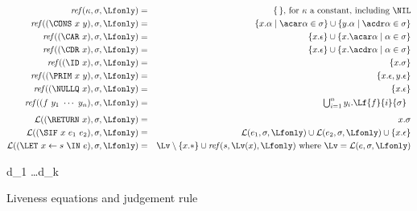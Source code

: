 \begin{figure}[t]  
\begin{eqnarray*}
\mathit{ref\/}(\kappa,\sigma,\Lfonly)
          &=& \{\,\} \mbox{, for $\kappa$ a constant, including $\NIL$}\\
\mathit{ref\/}((\CONS~x~y),\sigma,\Lfonly)
          &=& \{x.\alpha \mid \acar\alpha \in \sigma\} \cup \{y.\alpha \mid \acdr\alpha \in \sigma\} \\
\mathit{ref\/}((\CAR~x),\sigma,\Lfonly)
          &=& \{x.\epsilon\} \cup \{x.\acar\alpha \mid \alpha \in \sigma\} \\
\mathit{ref\/}((\CDR~x),\sigma,\Lfonly)
          &=& \{x.\epsilon\} \cup \{x.\acdr\alpha \mid \alpha \in \sigma\} \\
\mathit{ref\/}((\ID~x),\sigma,\Lfonly)
          &=& \{x.\sigma\} \\
\mathit{ref\/}((\PRIM~x~y),\sigma,\Lfonly)
          &=& \{x.\epsilon,y.\epsilon\} \\
\mathit{ref\/}((\NULLQ~x),\sigma,\Lfonly)
          &=& \{x.\epsilon\} \\
\mathit{ref\/}((f~y_1~\cdots~y_n),\sigma,\Lfonly)
          &=&  \begin{array}{@{}l}  %
               \bigcup_{i=1}^n y_i.\Lf{f}{i}{\sigma}
               \end{array}
\\[1ex]
\mathcal{L}((\RETURN~x),\sigma,\Lfonly) &=& x.\sigma \\
\mathcal{L}((\SIF~x~e_1~e_2),\sigma,\Lfonly) &=&
        \mathcal{L}(e_1,\sigma,\Lfonly) \cup
        \mathcal{L}(e_2,\sigma,\Lfonly) \cup
        \{x.\epsilon\} \\
\mathcal{L}((\LET~x \leftarrow  s~\IN~e),\sigma,\Lfonly) &=&
        \Lv
           \setminus \{x.*\}
           \cup \mathit{ref\/}(s,\Lv(x),\Lfonly)
\mbox{ where } \Lv = \mathcal{L}(e,\sigma,\Lfonly)
\end{eqnarray*}

\begin{minipage}{0.85\textwidth}
        { d_1 \ldots d_k \len \Lfonly
\\ }
\end{minipage}

\normalsize
  \caption{Liveness equations and judgement rule}\label{fig:live-judge}
\end{figure}
%


